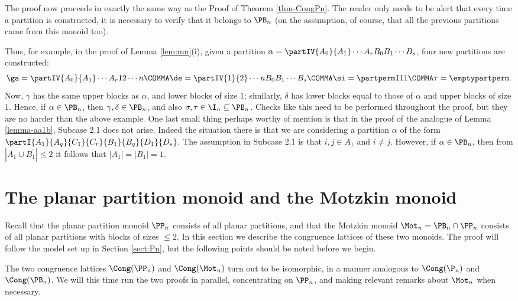 The proof now proceeds in exactly the same way as the Proof of Theorem \ref{thm-CongPn}.
The reader only needs to be alert that every time a partition is constructed, it is necessary to verify that it belongs to $\PB_n$ (on the assumption, of course, that all the previous partitions came from this monoid too).

Thus, for example, in the proof of Lemma \ref{lem:mn}(i), given a partition
$\alpha=\partIV{A_0}{A_1}\cdots{A_r}{B_0}{B_1}\cdots{B_s}$,
four new partitions are constructed:
\[
\ga=\partIV{A_0}{A_1}\cdots{A_r}{1}{2}\cdots{n}\COMMA
\de=\partIV{1}{2}\cdots{n}{B_0}{B_1}\cdots{B_s}\COMMA
\si=\partpermI11\COMMA
\tau=\emptypartperm .
\]
Now, $\gamma$ has the same upper blocks as $\alpha$, and lower blocks of size $1$;
similarly, $\delta$ has lower blocks equal to those of $\alpha$ and upper blocks of size $1$. Hence, if $\alpha\in\PB_n$, then $\gamma,\delta\in\PB_n$, and also
$\sigma,\tau\in\I_n\subseteq \PB_n$.
Checks like this need to be performed throughout the proof, but they are no harder than the above example.
%
One last small thing perhaps worthy of mention is that in the proof of the analogue of Lemma
\ref{lemma-aa1b}, Subcase 2.1 does not arise.
Indeed the situation there is that we are considering a partition $\alpha$ of the form
$\partI{A_1}{A_q}{C_1}{C_r}{B_1}{B_q}{D_1}{D_s}$.
The assumption in Subcase 2.1 is that $i,j\in A_1$ and $i\neq j$. However,
if $\alpha\in\PB_n$, then from $|A_1\cup B_1^\prime|\leq 2$ it follows that
$|A_1|=|B_1|=1$.








\section{The planar partition monoid  and the Motzkin monoid }
\label{sec:PPnMn}

Recall that the planar partition monoid $\PP_n$ consists of all planar partitions,
and that the Motzkin monoid $\Mot_n=\PB_n\cap \PP_n$ consists of all planar partitions with blocks of sizes $\leq 2$.
In this section we describe the congruence lattices of these two monoids. The proof will follow
the model set up in Section \ref{sect:Pn}, but the following points should be noted before we begin.

The two congruence lattices $\Cong(\PP_n)$ and $\Cong(\Mot_n)$ turn out to be isomorphic, in a manner analogous to $\Cong(\P_n)$ and $\Cong(\PB_n)$. We will this time run the two proofs in parallel, concentrating on $\PP_n$, and making relevant remarks about $\Mot_n$ when necessary.


